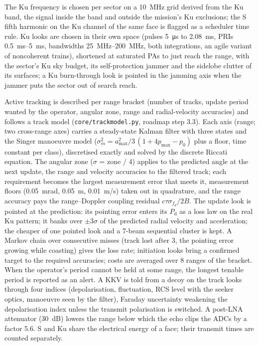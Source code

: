 \documentclass[11pt,a4paper]{article}
\newcommand{\code}[1]{\texttt{\small #1}}
\newcommand{\Pd}{P_{\mathrm d}}
\begin{document}
The Ku frequency is chosen per sector on a \SI{10}{MHz} grid derived from the Ku band, the signal inside the band and
outside the mission's Ku exclusions; the S fifth harmonic on the Ku channel of the same face is flagged as a scheduler
time rule. Ku looks are chosen in their own space (pulses \SI{5}{\micro s} to \SI{2.08}{ms}, PRIs \SIrange{0.5}{5}{ms},
bandwidths \SIrange{25}{200}{MHz}, both integrations, an agile variant of noncoherent trains), shortened at saturated
PAs to just reach the range, with the sector's Ku sky budget, its self-protection jammer and the sidelobe clutter of
its surfaces; a Ku burn-through look is pointed in the jamming axis when the jammer puts the sector out of search reach.

Active tracking is described per range bracket (number of tracks, update period wanted by the operator, angular
zone, range and radial-velocity accuracies) and follows a track model (\code{core/trackmodel.py}, roadmap step 3.3).
Each axis (range; two cross-range axes) carries a steady-state Kalman filter with three states and the Singer
manoeuvre model ($\sigma_m^2 = a_{\max}^2/3\,(1 + 4p_{\max} - p_0)$ plus a floor, time constant per class), discretised
exactly and solved by the discrete Riccati equation. The angular zone ($\sigma$ = zone / 4) applies to the predicted
angle at the next update, the range and velocity accuracies to the filtered track; each requirement becomes the
largest measurement error that meets it, measurement floors (\SI{0.05}{mrad}, \SI{0.05}{m}, \SI{0.01}{m/s}) taken out in
quadrature, and the range accuracy pays the range--Doppler coupling residual $c\tau\sigma_{f_d}/2B$. The update look is
pointed at the prediction: its pointing error enters its $\Pd$ as a loss law on the real Ku pattern; it banks over
$\pm 3\sigma$ of the predicted radial velocity and acceleration; the cheaper of one pointed look and a 7-beam
sequential cluster is kept. A Markov chain over consecutive misses (track lost after 3, the pointing error growing
while coasting) gives the loss rate; initiation looks bring a confirmed target to the required accuracies; costs are
averaged over 8 ranges of the bracket. When the operator's period cannot be held at some range, the longest tenable
period is reported as an alert. A KKV is told from a decoy on the track looks through four indices (depolarisation,
fluctuation, RCS level with the seeker optics, manoeuvre seen by the filter), Faraday uncertainty weakening the
depolarisation index unless the transmit polarisation is switched. A post-LNA attenuator (\SI{30}{dB}) lowers the
range below which the echo clips the ADCs by a factor 5.6. S and Ku share the electrical energy of a face; their
transmit times are counted separately.
\end{document}
